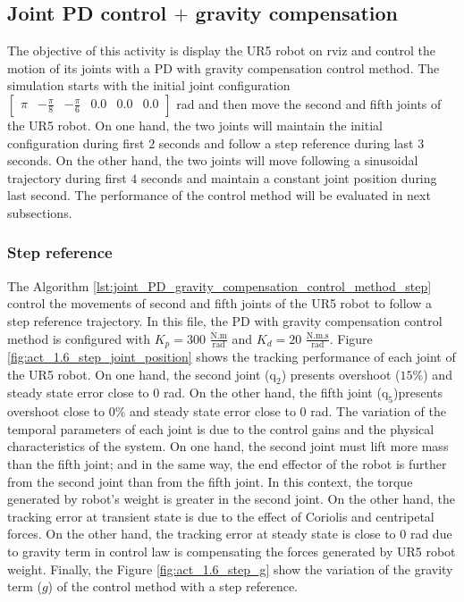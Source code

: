 \subsection{Joint PD control $+$ gravity compensation}
The objective of this activity is display the UR5 robot on rviz and control the motion of its joints with a PD with gravity compensation control method. The simulation starts with the initial joint configuration $\begin{bmatrix} \pi & -\frac{\pi}{8} & -\frac{\pi}{6} & 0.0 & 0.0 & 0.0 \end{bmatrix}$ rad and then move the second and fifth joints of the UR5 robot. On one hand, the two joints will maintain the initial configuration during first $2$ seconds and follow a step reference during last $3$ seconds. On the other hand, the two joints will move following a sinusoidal trajectory during first $4$ seconds and maintain a constant joint position during last second. The performance of the control method will be evaluated in next subsections.


\subsubsection{Step reference}
The Algorithm \ref{lst:joint_PD_gravity_compensation_control_method_step} control the movements of second and fifth joints of the UR5 robot to follow a step reference trajectory. In this file, the PD with gravity compensation control method is configured with $K_p=300$ $\mathrm{\frac{N.m}{rad}}$ and $K_d= 20 $ $\mathrm{\frac{N.m.s}{rad}}$. Figure \ref{fig:act_1.6_step_joint_position} shows the tracking performance of each joint of the UR5 robot. On one hand, the second joint ($\mathrm{q}_2$) presents overshoot ($15\%$) and steady state error close to $0$ rad. On the other hand, the fifth joint ($\mathrm{q}_5$)presents overshoot close to $0\%$ and steady state error close to $0$ rad. The variation of the temporal parameters of each joint is due to the control gains and the physical characteristics of the system. On one hand, the second joint must lift more mass than the fifth joint; and in the same way, the end effector of the robot is further from the second joint than from the fifth joint. In this context, the torque generated by robot's weight is greater in the second joint. On the other hand, the tracking error at transient state is due to the effect of Coriolis and centripetal forces. On the other hand, the tracking error at steady state is close to $0$ rad due to gravity term in control law is compensating the forces generated by UR5 robot weight. Finally, the Figure \ref{fig:act_1.6_step_g} show the variation of the gravity term ($g$) of the control method with a step reference. 

